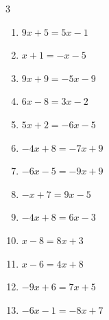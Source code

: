 \begin{multicols}{3}
\begin{enumerate}

  \item $9x+5=5x-1$


  \item $x+1=-x-5$

        \phantom{$\displaystyle x=-3$}

  \item $9x+9=-5x-9$


  \item $6x-8=3x-2$

        \phantom{$\displaystyle x=2$}

  \item $5x+2=-6x-5$


  \item $-4x+8=-7x+9$


  \item $-6x-5=-9x+9$


  \item $-x+7=9x-5$


\columnbreak %

  \item $-4x+8=6x-3$


  \item $x-8=8x+3$


  \item $x-6=4x+8$


  \item $-9x+6=7x+5$


  \item $-6x-1=-8x+7$

        \phantom{$\displaystyle x=4$}


\end{enumerate}
\end{multicols}
